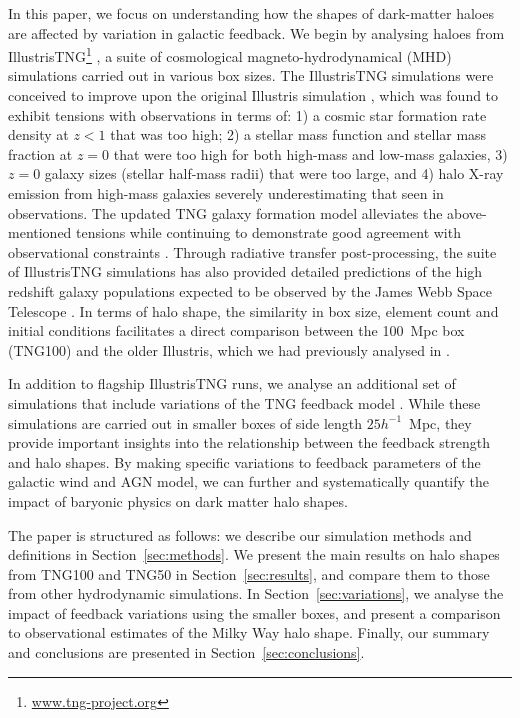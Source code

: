\documentclass[fleqn,usenatbib]{mnras}
\begin{document}
In this paper, we focus on understanding how the shapes of dark-matter haloes are affected by variation in galactic feedback.
We begin by analysing haloes from IllustrisTNG\footnote{\url{www.tng-project.org}} \citep[hereafter, TNG:][]{Marinacci18v480, Naiman18v477, Nelson17v475, Pillepich18v475, Springel18v475}, a suite of cosmological magneto-hydrodynamical (MHD) simulations  carried out in various box sizes. %
The IllustrisTNG simulations were conceived to improve upon the original Illustris simulation \citep{Vogelsberger13v436, Vogelsberger14v444,Illustris,Genel14v445}, which was found to exhibit tensions with observations in terms of:
1) a cosmic star formation rate density at $z<1$ that was too high;
2) a stellar mass function and stellar mass fraction at $z=0$ that were too high for both high-mass and low-mass galaxies,
3) $z=0$ galaxy sizes (stellar half-mass radii) that were too large, and 4) halo X-ray emission from high-mass galaxies severely underestimating that seen in observations.
The updated TNG galaxy formation model alleviates the above-mentioned tensions while continuing to demonstrate good agreement with observational constraints \citep[see][for a partial list]{Nelson19TNGrelease}.
Through radiative transfer post-processing, the suite of IllustrisTNG simulations has  also provided detailed predictions of the high redshift galaxy populations expected to be observed by the James Webb Space Telescope \citep{Vogelsberger20v492, Shen20v495, Shen2021}.
In terms of halo shape, the similarity in box size, element count and initial conditions facilitates a direct comparison  between the 100~Mpc box (TNG100) and the older Illustris, which we had previously analysed in \cite{Chua19v484}.


In addition to flagship IllustrisTNG runs, we analyse an additional set of simulations that include variations of the TNG feedback model \citep[see][for more details]{Pillepich18v473}.
While these simulations are carried out in smaller boxes of side length $25h^{-1}$~Mpc, they provide important insights into the relationship between the feedback strength and halo shapes.
By making specific variations to feedback parameters of the galactic wind and AGN model, we can further and systematically quantify the impact of baryonic physics on dark matter halo shapes.

The paper is structured as follows:
we describe our simulation methods and definitions in Section~\ref{sec:methods}.
We present the main results on halo shapes from TNG100 and TNG50 in Section~\ref{sec:results}, and compare them to those from other hydrodynamic simulations.
In Section~\ref{sec:variations}, we analyse the impact of feedback variations using the smaller boxes, and present a comparison to observational estimates of the Milky Way halo shape. 
Finally, our summary and conclusions are presented in Section~\ref{sec:conclusions}.
\end{document}
